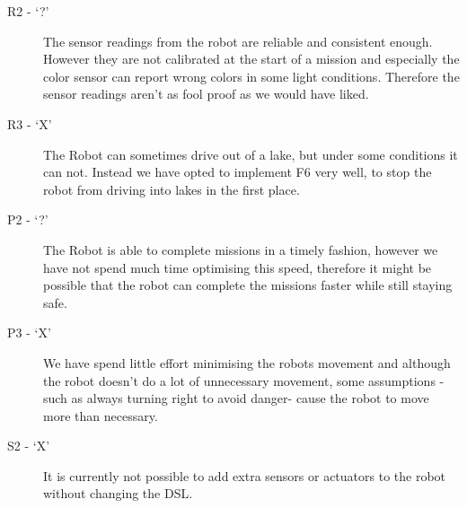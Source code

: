 \begin{description}
	\item[R2 - `?'] The sensor readings from the robot are reliable and 
		consistent enough. However they are not calibrated at the start of a
		mission and especially the color sensor can report wrong colors in some
		light conditions. Therefore the sensor readings aren't as fool proof as
		we would have liked.
	\item[R3 - `X'] The Robot can sometimes drive out of a lake, but under some
		conditions it can not. Instead we have opted to implement F6 very 
		well, to stop the robot from driving into lakes in the first place.
	\item[P2 - `?'] The Robot is able to complete missions in a timely fashion,
		however we have not spend much time optimising this speed, therefore
		it might be possible that the robot can complete the missions faster 
		while still staying safe.
	\item[P3 - `X'] We have spend little effort minimising the robots movement
		and although the robot doesn't do a lot of unnecessary movement, some 
		assumptions -such as always turning right to avoid danger- cause the
		robot to move more than necessary.
	\item[S2 - `X'] It is currently not possible to add extra sensors or 
		actuators to the robot without changing the DSL. 
\end{description}